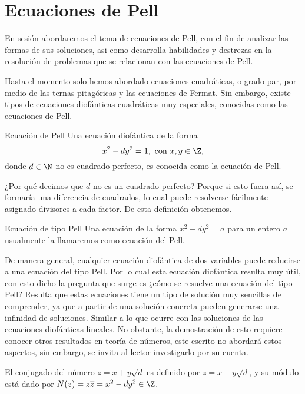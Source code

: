 \section{Ecuaciones de Pell}

En sesión abordaremos el tema de ecuaciones de Pell, con el fin de analizar las formas de sus soluciones, asi como
desarrolla habilidades y destrezas en la resolución de problemas que se relacionan con las ecuaciones de Pell.

Hasta el momento solo hemos abordado ecuaciones cuadráticas, o grado par, por medio de las ternas pitagóricas y
las ecuaciones de Fermat.
Sin embargo, existe tipos de ecuaciones diofánticas cuadráticas muy especiales, conocidas como las ecuaciones de Pell.

\begin{definition.box}{Ecuación de Pell}{}
    Una ecuación diofántica de la forma
    \[
        x^2 - dy^2 = 1, \ \text{con} \ x,y \in \Z,
    \]
    donde $d \in \N$ no es cuadrado perfecto, es conocida como la ecuación de Pell.
\end{definition.box}

¿Por qué decimos que $d$ no es un cuadrado perfecto?
Porque si esto fuera así, se formaría una diferencia de cuadrados, lo cual puede resolverse fácilmente asignado divisores a cada factor.
De esta definición obtenemos.

\begin{definition.box}{Ecuación de tipo Pell}{}
    Una ecuación de la forma $x^2 - dy^2 = a$ para un entero $a$ usualmente la llamaremos como ecuación del Pell.
\end{definition.box}

De manera general, cualquier ecuación diofántica de dos variables puede reducirse a una ecuación del tipo Pell.
Por lo cual esta ecuación diofántica resulta muy útil, con esto dicho la pregunta que surge es ¿cómo se resuelve una ecuación del tipo Pell?
Resulta que estas ecuaciones tiene un tipo de solución muy sencillas de comprender, ya que a partir de una solución concreta pueden generarse una infinidad de soluciones.
Similar a lo que ocurre con las soluciones de las ecuaciones diofánticas lineales.
No obstante, la demostración de esto requiere conocer otros resultados en teoría de números, este escrito no abordará estos aspectos, sin embargo, se invita al lector investigarlo por su cuenta.

\begin{definition.box}{}{}
    El conjugado del número $z = x + y\sqrt{d}$ es definido por $\overline{z} = x - y \sqrt{d}$, y su módulo está dado por $N(z) = z \overline{z} = x^2 - dy^2 \in \Z$.
\end{definition.box}

